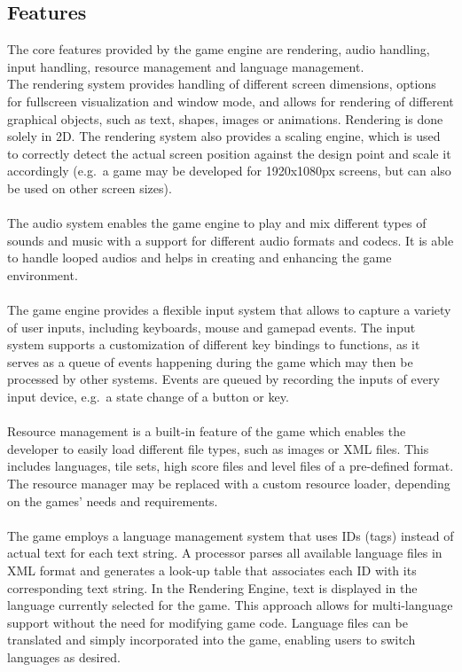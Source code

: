 \subsection{Features}\label{subsec:features}
The core features provided by the game engine are rendering, audio handling, input handling, resource management and language management.
\\
The rendering system provides handling of different screen dimensions, options for fullscreen visualization and window mode, and allows
for rendering of different graphical objects, such as text, shapes, images or animations.
Rendering is done solely in 2D.
The rendering system also provides a scaling engine, which is used to correctly detect the actual screen position against the design point and scale it accordingly
(e.g.\ a game may be developed for 1920x1080px screens, but can also be used on other screen sizes).
\\
\\
The audio system enables the game engine to play and mix different types of sounds and music with a support for different audio formats and codecs.
It is able to handle looped audios and helps in creating and enhancing the game environment.
\\
\\
The game engine provides a flexible input system that allows to capture a variety of user inputs, including keyboards, mouse and gamepad events.
The input system supports a customization of different key bindings to functions, as it serves as a queue of events happening during the game which
may then be processed by other systems.
Events are queued by recording the inputs of every input device, e.g.\ a state change of a button or key.
\\
\\
Resource management is a built-in feature of the game which enables the developer to easily load different file types, such as images or \gls{XML} files.
This includes languages, tile sets, high score files and level files of a pre-defined format.
The resource manager may be replaced with a custom resource loader, depending on the games' needs and requirements.
\\
\\
The game employs a language management system that uses IDs (tags) instead of actual text for each text string.
A processor parses all available language files in XML format and generates a look-up table that associates each ID with its corresponding text string.
In the Rendering Engine, text is displayed in the language currently selected for the game.
This approach allows for multi-language support without the need for modifying game code.
Language files can be translated and simply incorporated into the game, enabling users to switch languages as desired.
